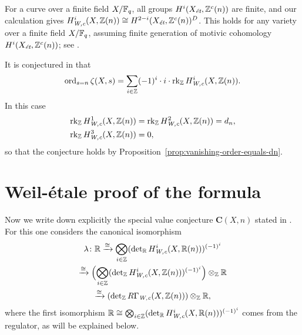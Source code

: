 \documentclass[draft]{article}
\numberwithin{equation}{section}
\begin{document}
\begin{remark}
  For a curve over a finite field $X/\FF_q$, all groups $H^i (X_\et, \ZZ^c(n))$
  are finite, and our calculation gives
  $H^i_\Wc (X, \ZZ(n)) \cong H^{2-i} (X_\et, \ZZ^c(n))^D$.
  This holds for any variety over a finite field $X/\FF_q$, assuming finite
  generation of motivic cohomology $H^i (X_\et, \ZZ^c(n))$; see
  \cite[Proposition~7.7]{Beshenov-Weil-etale-1}.
\end{remark}

\begin{remark}
  It is conjectured in \cite[\S 3]{Beshenov-Weil-etale-2} that
  \[ \ord_{s = n} \zeta (X,s) =
    \sum_{i\in \ZZ} (-1)^i\cdot i\cdot\rk_\ZZ H^i_\Wc (X,\ZZ(n)). \]
  In this case
  \begin{align*}
    \rk_\ZZ H^1_\Wc (X,\ZZ(n)) & = \rk_\ZZ H^2_\Wc (X,\ZZ(n)) = d_n, \\
    \rk_\ZZ H^3_\Wc (X,\ZZ(n)) & = 0,
  \end{align*}
  so that the conjecture holds by
  Proposition~\ref{prop:vanishing-order-equals-dn}.
\end{remark}


\section{Weil-\'{e}tale proof of the formula}
\label{sec:special-value-formula}

Now we write down explicitly the special value conjecture $\mathbf{C} (X,n)$
stated in \cite[\S 4]{Beshenov-Weil-etale-2}. For this one considers the
canonical isomorphism
\begin{multline*}
  \lambda\colon \RR \xrightarrow{\cong}
  \bigotimes_{i\in \ZZ} (\det_\RR H^i_\Wc (X, \RR (n)))^{(-1)^i} \\
  \xrightarrow{\cong} \Bigl(\bigotimes_{i\in \ZZ} (\det_\ZZ H^i_\Wc (X, \ZZ (n)))^{(-1)^i}\Bigr) \otimes_\ZZ \RR \\
  \xrightarrow{\cong} (\det_\ZZ R\Gamma_\Wc (X, \ZZ (n))) \otimes_\ZZ \RR,
\end{multline*}
where the first isomorphism
$\RR \cong \bigotimes_{i\in \ZZ} (\det_\RR H^i_\Wc (X, \RR (n)))^{(-1)^i}$
comes from the regulator, as will be explained below.

\vspace{1em}
\end{document}
